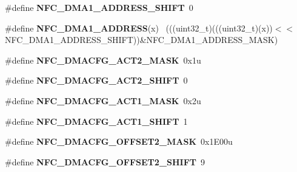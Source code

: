 \begin{DoxyCompactItemize}
\item 
\hypertarget{group___n_f_c___register___masks_gad8a0bc94b7aed1b9a6447c0c7fd5a4dc}{}\#define {\bfseries N\+F\+C\+\_\+\+D\+M\+A1\+\_\+\+A\+D\+D\+R\+E\+S\+S\+\_\+\+S\+H\+I\+F\+T}~0\label{group___n_f_c___register___masks_gad8a0bc94b7aed1b9a6447c0c7fd5a4dc}

\item 
\hypertarget{group___n_f_c___register___masks_ga65da621ccfb38d66ad98299762ed855c}{}\#define {\bfseries N\+F\+C\+\_\+\+D\+M\+A1\+\_\+\+A\+D\+D\+R\+E\+S\+S}(x)                                        ~(((uint32\+\_\+t)(((uint32\+\_\+t)(x))$<$$<$N\+F\+C\+\_\+\+D\+M\+A1\+\_\+\+A\+D\+D\+R\+E\+S\+S\+\_\+\+S\+H\+I\+F\+T))\&N\+F\+C\+\_\+\+D\+M\+A1\+\_\+\+A\+D\+D\+R\+E\+S\+S\+\_\+\+M\+A\+S\+K)\label{group___n_f_c___register___masks_ga65da621ccfb38d66ad98299762ed855c}

\item 
\hypertarget{group___n_f_c___register___masks_ga6c2db5b26be6d4ec79f775c4a8495f53}{}\#define {\bfseries N\+F\+C\+\_\+\+D\+M\+A\+C\+F\+G\+\_\+\+A\+C\+T2\+\_\+\+M\+A\+S\+K}~0x1u\label{group___n_f_c___register___masks_ga6c2db5b26be6d4ec79f775c4a8495f53}

\item 
\hypertarget{group___n_f_c___register___masks_gafe193866fec711f3f7ef093cf804d895}{}\#define {\bfseries N\+F\+C\+\_\+\+D\+M\+A\+C\+F\+G\+\_\+\+A\+C\+T2\+\_\+\+S\+H\+I\+F\+T}~0\label{group___n_f_c___register___masks_gafe193866fec711f3f7ef093cf804d895}

\item 
\hypertarget{group___n_f_c___register___masks_ga35873cf967b74875a3a386baba5d5338}{}\#define {\bfseries N\+F\+C\+\_\+\+D\+M\+A\+C\+F\+G\+\_\+\+A\+C\+T1\+\_\+\+M\+A\+S\+K}~0x2u\label{group___n_f_c___register___masks_ga35873cf967b74875a3a386baba5d5338}

\item 
\hypertarget{group___n_f_c___register___masks_ga06b87ef1219099fe1b324bb7938a5a42}{}\#define {\bfseries N\+F\+C\+\_\+\+D\+M\+A\+C\+F\+G\+\_\+\+A\+C\+T1\+\_\+\+S\+H\+I\+F\+T}~1\label{group___n_f_c___register___masks_ga06b87ef1219099fe1b324bb7938a5a42}

\item 
\hypertarget{group___n_f_c___register___masks_ga2be586791d3ce7572ce27e190b1eebc9}{}\#define {\bfseries N\+F\+C\+\_\+\+D\+M\+A\+C\+F\+G\+\_\+\+O\+F\+F\+S\+E\+T2\+\_\+\+M\+A\+S\+K}~0x1\+E00u\label{group___n_f_c___register___masks_ga2be586791d3ce7572ce27e190b1eebc9}

\item 
\hypertarget{group___n_f_c___register___masks_ga2fac66ff048a5be807f71249dea6c807}{}\#define {\bfseries N\+F\+C\+\_\+\+D\+M\+A\+C\+F\+G\+\_\+\+O\+F\+F\+S\+E\+T2\+\_\+\+S\+H\+I\+F\+T}~9\label{group___n_f_c___register___masks_ga2fac66ff048a5be807f71249dea6c807}


\end{DoxyCompactItemize}
